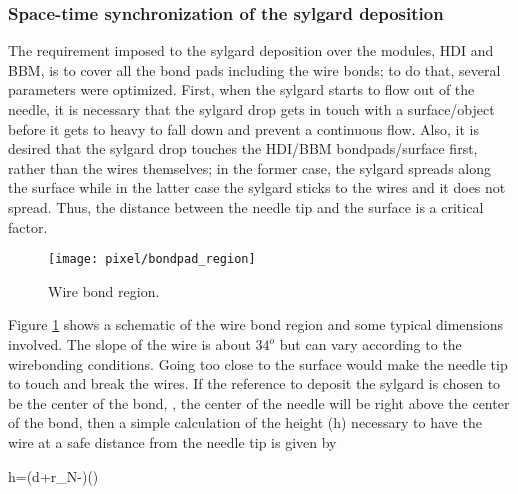 \subsubsection*{Space-time synchronization of the sylgard deposition}

The requirement imposed to the sylgard deposition over the modules, HDI and BBM, is to cover all the bond pads including the wire bonds; to do that, several parameters were optimized. First, when the sylgard starts to flow out of the needle, it is necessary that the sylgard drop gets in touch with a surface/object before it gets to heavy to fall down and prevent a continuous flow. Also, it is desired that the sylgard drop touches the HDI/BBM bondpads/surface first, rather than the wires themselves; in the former case, the sylgard spreads along the surface while in the latter case the sylgard sticks to the wires and it does not spread. Thus, the distance between the needle tip and the surface is a critical factor.

\begin{figure}[h]
  \begin{center}
    \texttt{[image: pixel/bondpad\_region]}
    \caption[Wire bond region.]{Wire bond region.}\label{fig:bondpad_region}
  \end{center}
\end{figure}

Figure \ref{fig:bondpad_region} shows a schematic of the wire bond region and some typical dimensions involved. The slope of the wire is about $34^o$ but can vary according to the wirebonding conditions. Going too close to the surface would make the needle tip to touch and break the wires. If the reference to deposit the sylgard is chosen to be the center of the bond, \ie, the center of the needle will be right above the center of the bond, then a simple calculation of the height (h) necessary to have the wire at a safe distance from the needle tip is given by 

\beqn
h=\left(d+r_N-\right )\tan(\theta)
\eeqn

